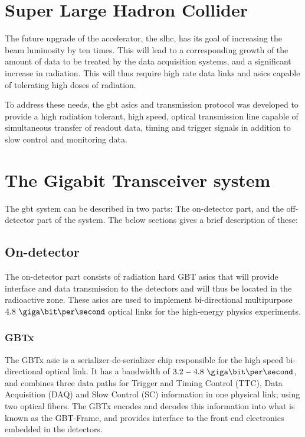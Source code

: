\documentclass[main.tex]{subfiles}
\begin{document}
\section{Super Large Hadron Collider}

The future upgrade of the  accelerator, the \gls{slhc}, has its goal of increasing the beam luminosity by ten times. This will lead to a corresponding growth of the amount of data to be treated by the data acquisition systems, and a significant increase in radiation. This will thus require high rate data links and \glspl{asic} capable of tolerating high doses of radiation.

To address these needs, the \gls{gbt} \glspl{asic} and transmission protocol was developed to provide a high radiation tolerant, high speed, optical transmission line capable of simultaneous transfer of readout data, timing and trigger signals in addition to slow control and monitoring data.

\section{The Gigabit Transceiver system}
The \gls{gbt} system can be described in two parts: The on-detector part, and the off-detector part of the system. The below sections gives a brief description of these:

\subsection{On-detector}
The on-detector part consists of radiation hard GBT \acrshort{asic}s that will provide interface and data transmission to the detectors and will thus be located in the radioactive zone. These \glspl{asic} are used to implement bi-directional multipurpose $4.8~\giga\bit\per\second$ optical links for the high-energy physics experiments.

\subsubsection{GBTx}
The GBTx \gls{asic} is a serializer-de-serializer chip responsible for the high speed bi-directional optical link. It has a bandwidth of $3.2 - 4.8~\giga\bit\per\second$, and combines three data paths for Trigger and Timing Control (TTC), Data Acquisition (DAQ) and Slow Control (SC) information in one physical link; using two optical fibers. The GBTx encodes and decodes this information into what is known as the GBT-Frame, and provides interface to the front end electronics embedded in the detectors. \cite{gbtxman11}
\end{document}
